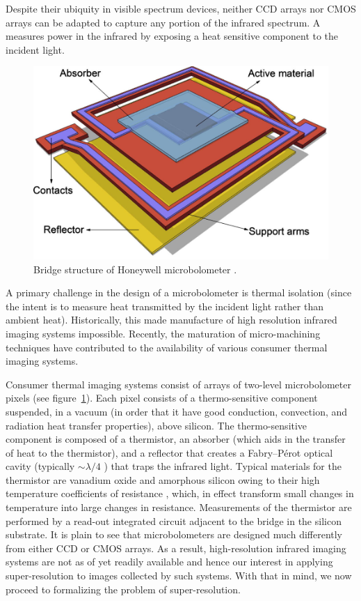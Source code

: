 Despite their ubiquity in visible spectrum devices, neither CCD arrays nor CMOS arrays can be adapted to capture any portion of the infrared spectrum.
%
A  measures power in the infrared by exposing a heat sensitive component to the incident light.
%
\begin{figure}[!htbp]
	\center
	\includegraphics[width=\linewidth,keepaspectratio]{figures/background/microbolometer2.png}
	\caption{Bridge structure of Honeywell microbolometer \cite{KESIM2014245}.}
	\label{fig:microbolometer}
\end{figure}
%
A primary challenge in the design of a microbolometer is thermal isolation (since the intent is to measure heat transmitted by the incident light rather than ambient heat).
%
Historically, this made manufacture of high resolution infrared imaging systems impossible.
%
Recently, the maturation of micro-machining techniques have contributed to the availability of various consumer thermal imaging systems.

Consumer thermal imaging systems consist of arrays of two-level microbolometer pixels (see figure~\ref{fig:microbolometer}). 
%
Each pixel consists of a thermo-sensitive component suspended, in a vacuum (in order that it have good conduction, convection, and radiation heat transfer properties), above silicon.
%
The thermo-sensitive component is composed of a thermistor, an absorber (which aids in the transfer of heat to the thermistor), and a reflector that creates a Fabry–Pérot optical cavity (typically \({\sim}\lambda/4\) \cite{bolometer}) that traps the infrared light.
%
Typical materials for the thermistor are vanadium oxide and amorphous silicon owing to their high temperature coefficients of resistance \cite{bolometer}, which, in effect transform small changes in temperature into large changes in resistance.
%
Measurements of the thermistor are performed by a read-out integrated circuit adjacent to the bridge in the silicon substrate.
%
It is plain to see that microbolometers are designed much differently from either CCD or CMOS arrays.
%
As a result, high-resolution infrared imaging systems are not as of yet readily available and hence our interest in applying super-resolution to images collected by such systems.
%
With that in mind, we now proceed to formalizing the problem of super-resolution.

